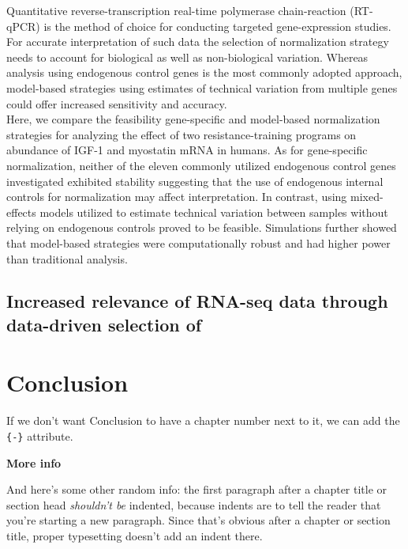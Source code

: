 \documentclass[twoside,10pt]{gihclass} %
\begin{document}
Quantitative reverse-transcription real-time polymerase chain-reaction (RT-qPCR) is the method of choice for conducting targeted gene-expression studies.
For accurate interpretation of such data the selection of normalization strategy needs to account for biological as well as non-biological variation.
Whereas analysis using endogenous control genes is the most commonly adopted approach, model-based strategies using estimates of technical variation from multiple genes could offer increased sensitivity and accuracy.\\
Here, we compare the feasibility gene-specific and model-based normalization strategies for analyzing the effect of two resistance-training programs on abundance of IGF-1 and myostatin mRNA in humans. As for gene-specific normalization, neither of the eleven commonly utilized endogenous control genes investigated exhibited stability suggesting that the use of endogenous internal controls for normalization may affect interpretation. In contrast, using mixed-effects models utilized to estimate technical variation between samples without relying on endogenous controls proved to be feasible.
Simulations further showed that model-based strategies were computationally robust and had higher power than traditional analysis.

\hypertarget{increased-relevance-of-rna-seq-data-through-data-driven-selection-of}{%
\section{Increased relevance of RNA-seq data through data-driven selection of}\label{increased-relevance-of-rna-seq-data-through-data-driven-selection-of}}

\hypertarget{conclusion}{%
\chapter*{Conclusion}\label{conclusion}}

If we don't want Conclusion to have a chapter number next to it, we can add the \texttt{\{-\}} attribute.

\textbf{More info}

And here's some other random info: the first paragraph after a chapter title or section head \emph{shouldn't be} indented, because indents are to tell the reader that you're starting a new paragraph. Since that's obvious after a chapter or section title, proper typesetting doesn't add an indent there.
\end{document}
